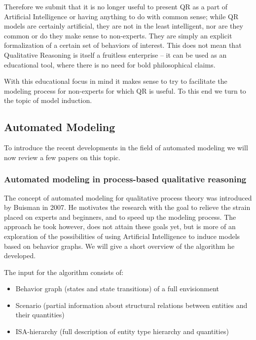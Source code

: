 \documentclass{article} %
\begin{document}
Therefore we submit that it is no longer useful to present QR as a part of
Artificial Intelligence or having anything to do with common sense; while QR
models are certainly artificial, they are not in the least intelligent, nor are
they common or do they make sense to non-experts.  They are simply an explicit
formalization of a certain set of behaviors of interest. This does not mean
that Qualitative Reasoning is itself a fruitless enterprise -- it can be used
as an educational tool, where there is no need for bold philosophical claims.

With this educational focus in mind it makes sense to try to facilitate the
modeling process for non-experts for which QR is useful. To this end we turn
to the topic of model induction.

\subsection{Automated Modeling} %
\label{sec:litrev_am}
To introduce the recent developments in the field of automated modeling we
will now review a few papers on this topic.

\subsubsection{Automated modeling in process-based qualitative reasoning}
\label{sec:litrev_am_buisman}
The concept of automated modeling for qualitative process theory was
introduced by Buisman \cite{buisman} in 2007. He motivates the research with
the goal to relieve the strain placed on experts and beginners, and to speed
up the modeling process. The approach he took however, does not attain these
goals yet, but is more of an exploration of the possibilities of using
Artificial Intelligence to induce models based on behavior graphs. We will
give a short overview of the algorithm he developed.

The input for the algorithm consists of:

\begin{itemize}

\item Behavior graph (states and state transitions) of a full envisionment

\item Scenario (partial information about structural relations between entities and their quantities)

\item ISA-hierarchy (full description of entity type hierarchy and quantities)

\end{itemize}
\end{document}
